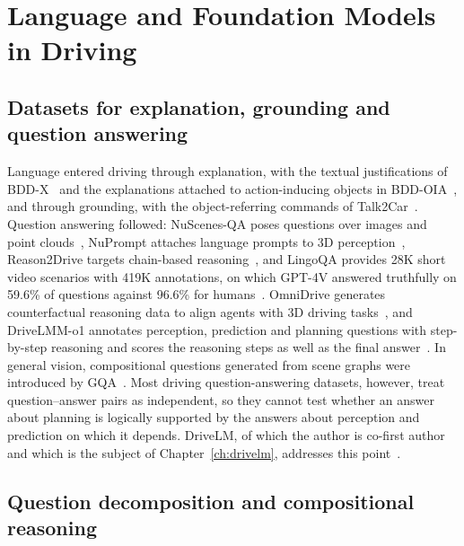 \section{Language and Foundation Models in Driving}\label{sec:bg:lang}

\subsection{Datasets for explanation, grounding and question answering}

Language entered driving through explanation, with the textual justifications of BDD-X~\cite{kim2018bddx} and the explanations attached to action-inducing objects in BDD-OIA~\cite{xu2020bddoia}, and through grounding, with the object-referring commands of Talk2Car~\cite{deruyttere2019talk2car}. Question answering followed: NuScenes-QA poses questions over images and point clouds~\cite{qian2024nuscenesqa}, NuPrompt attaches language prompts to 3D perception~\cite{wu2025nuprompt}, Reason2Drive targets chain-based reasoning~\cite{nie2024reason2drive}, and LingoQA provides 28K short video scenarios with 419K annotations, on which GPT-4V answered truthfully on 59.6\% of questions against 96.6\% for humans~\cite{marcu2024lingoqa}. OmniDrive generates counterfactual reasoning data to align agents with 3D driving tasks~\cite{wang2025omnidrive}, and DriveLMM-o1 annotates perception, prediction and planning questions with step-by-step reasoning and scores the reasoning steps as well as the final answer~\cite{ishaq2025drivelmmo1}. In general vision, compositional questions generated from scene graphs were introduced by GQA~\cite{hudson2019gqa}. Most driving question-answering datasets, however, treat question--answer pairs as independent, so they cannot test whether an answer about planning is logically supported by the answers about perception and prediction on which it depends. DriveLM, of which the author is co-first author and which is the subject of Chapter~\ref{ch:drivelm}, addresses this point~\cite{sima2024drivelm}.

\subsection{Question decomposition and compositional reasoning}

